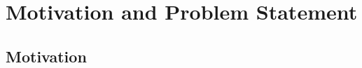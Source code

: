 %
\chapter{Motivation and Problem Statement}
\label{sec:problem-statement}

%
%
%
%
%

\section{Motivation}
\label{sec:problem-statement:motivation}


%



